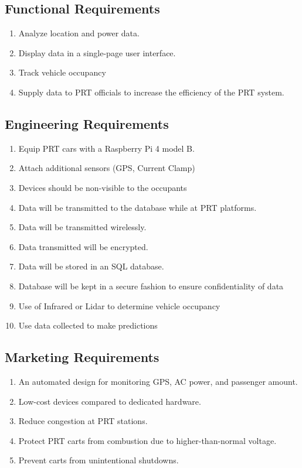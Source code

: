 \subsection{Functional Requirements}
\begin{enumerate}
    \item Analyze location and power data. 
    \item Display data in a single-page user interface.
    \item Track vehicle occupancy
    \item Supply data to PRT officials to increase the efficiency of the PRT system.
\end{enumerate}

\subsection{Engineering Requirements}
\begin{enumerate}
    \item Equip PRT cars with a Raspberry Pi 4 model B. 
    \item Attach additional sensors (GPS, Current Clamp)
    \item Devices should be non-visible to the occupants
    \item Data will be transmitted to the database while at PRT platforms.
    \item Data will be transmitted wirelessly. 
    \item Data transmitted will be encrypted. 
    \item Data will be stored in an SQL database. 
    \item Database will be kept in a secure fashion to ensure confidentiality of data
    \item Use of Infrared or Lidar to determine vehicle occupancy
    \item Use data collected to make predictions
\end{enumerate}

\subsection{Marketing Requirements}
\begin{enumerate}
    \item An automated design for monitoring GPS, AC power, and passenger amount.
    \item Low-cost devices compared to dedicated hardware.
    \item Reduce congestion at PRT stations.
    \item Protect PRT carts from combustion due to higher-than-normal voltage.
    \item Prevent carts from unintentional shutdowns.    
\end{enumerate}


